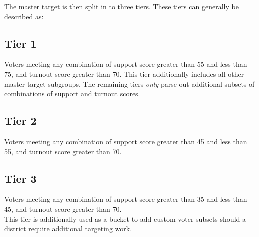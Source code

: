 \documentclass[12pt]{article}
\begin{document}
The master target is then split in to three tiers. These tiers can generally be described as: \\

\subsection*{Tier 1}

Voters meeting any combination of support score greater than 55 and less than 75, and turnout score greater than 70. This tier additionally includes all other master target subgroups. The remaining tiers \textit{only} parse out additional subsets of combinations of support and turnout scores.\\

\subsection*{Tier 2}
Voters meeting any combination of support score greater than 45 and less than 55, and turnout score greater than 70.

\subsection*{Tier 3}
Voters meeting any combination of support score greater than 35 and less than 45, and turnout score greater than 70.\\

This tier is additionally used as a bucket to add custom voter subsets should a district require additional targeting work.

\newpage
\theendnotes
\end{document}

